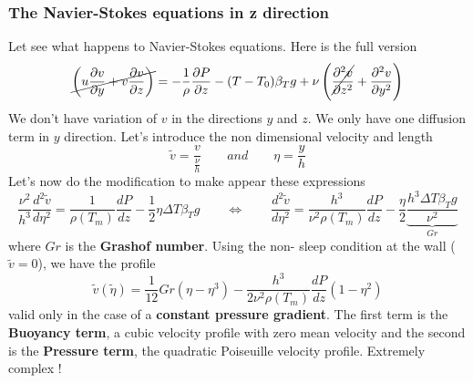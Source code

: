 	\subsubsection{The Navier-Stokes equations in z direction}
		Let see what happens to Navier-Stokes equations. Here is the full version 
		\begin{equation}
			\cancel{\left( u\frac{\partial v}{\partial y} + v\frac{\partial v}{\partial z} \right)} = - \frac{1}{\rho} \frac{\partial P}{\partial z} - (T-T_0)\beta _T g + \nu \left( \cancel{\frac{\partial ^2 v}{\partial z^2}} + \frac{\partial ^2 v}{\partial y^2} \right)
		\end{equation}
		We don't have variation of $v$ in the directions $y$ and $z$. We only have one diffusion term in $y$ direction. Let's introduce the non dimensional velocity and length
		\begin{equation}
			\tilde{v} = \frac{v}{\frac{\nu}{h}} \qquad and \qquad \eta = \frac{y}{h}
		\end{equation}
	 	Let's now do the modification to make appear these expressions
	 	\begin{equation}
	 		\frac{\nu ^2}{h^3} \frac{d^2 \tilde{v}}{d \eta ^2} = \frac{1}{\rho (T_m)} \frac{dP}{dz} - \frac{1}{2} \eta \Delta T \beta _T g \qquad \Leftrightarrow \qquad 
	 		\frac{d^2 \tilde{v}}{d \eta ^2} = \frac{h^3}{\nu ^2\rho (T_m)} \frac{dP}{dz} - \frac{\eta}{2} \underbrace{\frac{h^3 \Delta T \beta _T g}{\nu ^2}}_{Gr}
	 	\end{equation}
		where $Gr$ is the \textbf{Grashof number}. Using the non-		sleep condition at the wall ($\tilde{v} = 0$), we have the 	profile 
		\begin{equation}
			\tilde{v} (\tilde{\eta}) = \frac{1}{12} Gr (\eta - \eta ^3) - \frac{h^3}{2\nu ^2\rho (T_m)} \frac{dP}{dz} (1-\eta ^2)
		\end{equation}
		valid only in the case of a \textbf{constant pressure gradient}. The first term is the \textbf{Buoyancy term}, a cubic velocity profile with zero mean velocity and the second is the \textbf{Pressure term}, the quadratic Poiseuille velocity profile. Extremely complex ! 
		
